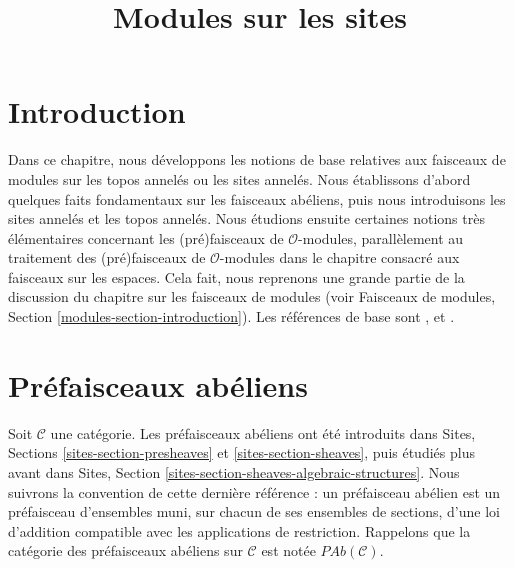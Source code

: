

%


\title{Modules sur les sites}


\maketitle

\label{section-phantom}

\tableofcontents

\section{Introduction}
\label{section-introduction}

\noindent
Dans ce chapitre, nous développons les notions de base relatives aux faisceaux
de modules sur les topos annelés ou les sites annelés. Nous établissons d'abord
quelques faits fondamentaux sur les faisceaux abéliens, puis nous introduisons
les sites annelés et les topos annelés. Nous étudions ensuite certaines notions
très élémentaires concernant les (pré)faisceaux de $\mathcal{O}$-modules,
parallèlement au traitement des (pré)faisceaux de $\mathcal{O}$-modules dans le
chapitre consacré aux faisceaux sur les espaces. Cela fait, nous reprenons une
grande partie de la discussion du chapitre sur les faisceaux de modules (voir
Faisceaux de modules, Section \ref{modules-section-introduction}). Les
références de base sont \cite{FAC}, \cite{EGA} et \cite{SGA4}.






\section{Préfaisceaux abéliens}
\label{section-abelian-pre-sheaves}

\noindent
Soit $\mathcal{C}$ une catégorie. Les préfaisceaux abéliens ont été introduits
dans Sites, Sections \ref{sites-section-presheaves} et
\ref{sites-section-sheaves}, puis étudiés plus avant dans Sites, Section
\ref{sites-section-sheaves-algebraic-structures}. Nous suivrons la convention
de cette dernière référence : un préfaisceau abélien est un préfaisceau
d'ensembles muni, sur chacun de ses ensembles de sections, d'une loi d'addition
compatible avec les applications de restriction. Rappelons que la catégorie
des préfaisceaux abéliens sur $\mathcal{C}$ est notée
$\textit{PAb}(\mathcal{C})$.

